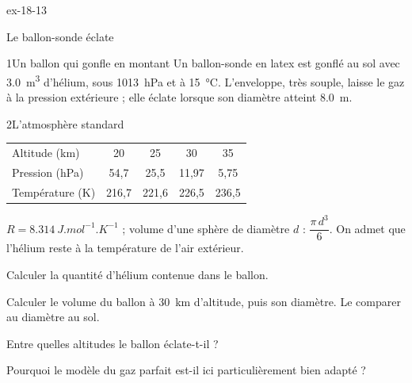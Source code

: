 \begin{blocLivre}{ex-18-13}
\begin{exercice}[3]{Le ballon-sonde éclate}
\begin{docu}{1}{Un ballon qui gonfle en montant}
Un ballon-sonde en latex est gonflé au sol avec \qty{3,0}{m^3} d'hélium, sous \qty{1013}{hPa} et à \qty{15}{\degreeCelsius}.
L'enveloppe, très souple, laisse le gaz à la pression extérieure ; elle éclate lorsque son diamètre atteint
\qty{8,0}{m}.
\end{docu}
\begin{docu}{2}{L'atmosphère standard}
\begin{center}
\begin{tabular}{lcccc}
\toprule
Altitude (km) & 20 & 25 & 30 & 35 \\
Pression (hPa) & 54,7 & 25,5 & 11,97 & 5,75 \\
Température (K) & 216,7 & 221,6 & 226,5 & 236,5 \\
\bottomrule
\end{tabular}
\end{center}
\end{docu}
\begin{donnees}
$R=\qty{8,314}{J.mol^{-1}.K^{-1}}$ ; volume d'une sphère de diamètre $d$ : $\dfrac{\pi\,d^3}{6}$. On admet que l'hélium reste
à la température de l'air extérieur.
\end{donnees}
\begin{questions}
\item Calculer la quantité d'hélium contenue dans le ballon.
\item Calculer le volume du ballon à \qty{30}{km} d'altitude, puis son diamètre. Le comparer au diamètre au sol.
\item \initiative Entre quelles altitudes le ballon éclate-t-il ?
\item Pourquoi le modèle du gaz parfait est-il ici particulièrement bien adapté ?
\end{questions}
\end{exercice}
\end{blocLivre}
